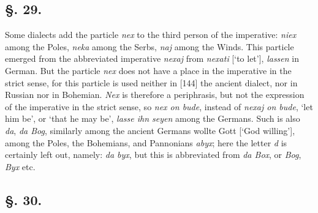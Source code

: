 \subsection*{\hspace*{\fill}§. 29.\hspace*{\fill}}

Some dialects add the particle \textit{nex} to the third person of the imperative: \textit{niex} among the Poles, \textit{neka} among the Serbs, \textit{naj} among the Winds. This particle emerged from the abbreviated imperative \textit{nexaj} from \textit{nexati} [‘to let’], \textit{lassen} in German. But the particle \textit{nex} does not have a place in the imperative in the strict sense, for this particle is used neither in [144] the ancient dialect, nor in Russian nor in Bohemian. \textit{Nex} is therefore a periphrasis, but not the expression of the imperative in the strict sense, so \textit{nex on bude}, instead of \textit{nexaj on bude}, ‘let him be’, or ‘that he may be’, \textit{lasse ihn seyen} among the Germans. Such is also \textit{da}, \textit{da Bog}, similarly among the ancient Germans {\wieynk wollte Gott} [‘God willing’], among the Poles, the Bohemians, and Pannonians \textit{abyx}; here the letter \textit{d} is certainly left out, namely: \textit{da byx}, but this is abbreviated from \textit{da Box}, or \textit{Bog}, \textit{Byx} etc.

\subsection*{\hspace*{\fill}§. 30.\hspace*{\fill}}

